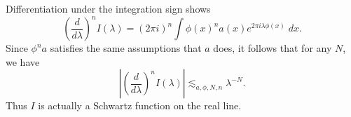 \begin{remark}
    Differentiation under the integration sign shows
    \[ \left( \frac{d}{d\lambda} \right)^n I (\lambda) = (2 \pi i)^n \int \phi(x)^n a(x) e^{2 \pi i \lambda \phi(x)}\; dx. \]
    Since $\phi^n a$ satisfies the same assumptions that $a$ does, it follows that for any $N$, we have
    \[ \left| \left( \frac{d}{d\lambda} \right)^n I (\lambda) \right| \lesssim_{a,\phi,N,n} \lambda^{-N}. \]
    Thus $I$ is actually a Schwartz function on the real line. %
\end{remark}

